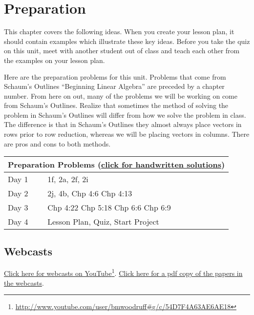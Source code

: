 \section{Preparation}

\noindent
This chapter covers the following ideas. When you create your lesson plan, it should contain examples which illustrate these key ideas. Before you take the quiz on this unit, meet with another student out of class and teach each other from the examples on your lesson plan. 



Here are the preparation problems for this unit.  Problems that come from Schaum's Outlines ``Beginning Linear Algebra'' are preceded by a chapter number. From here on out, many of the problems we will be working on come from Schaum's Outlines.  Realize that sometimes the method of solving the problem in Schaum's Outlines will differ from how we solve the problem in class. The difference is that in Schaum's Outlines they almost always place vectors in rows prior to row reduction, whereas we will be placing vectors in columns. There are pros and cons to both methods. 


\begin{center}
\begin{tabular}{ll}
\multicolumn{2}{c}{Preparation Problems
  (\href{http://ilearn.byui.edu/bbcswebdav/institution/Physical\_Sci\_Eng/Mathematics/Personal\%20Folders/WoodruffB/341/3-Patterns-Preparation-Solutions.pdf}{click
    for handwritten solutions})}
\\
\hline\hline
Day 1&
1f,
2a,
2f,
2i
\\ \hline
Day 2&
2j,
4b,
Chp 4:6
Chp 4:13
\\ \hline
Day 3&
Chp 4:22
Chp 5:18
Chp 6:6
Chp 6:9
\\ \hline
Day 4&
Lesson Plan,
Quiz, Start Project 
\\ \hline
\end{tabular}
\end{center}


\subsection{Webcasts}

\href{http://www.youtube.com/user/bmwoodruff\#g/c/54D7F4A63AE6AE18}{Click
  here for webcasts on YouTube}\footnote{\url{http://www.youtube.com/user/bmwoodruff\#g/c/54D7F4A63AE6AE18}}.  \href{http://ilearn.byui.edu/bbcswebdav/institution/Physical\_Sci\_Eng/Mathematics/Personal\%20Folders/WoodruffB/341/3-Patterns-videos.pdf}{Click
  here for a pdf copy of the papers in the webcasts}.

